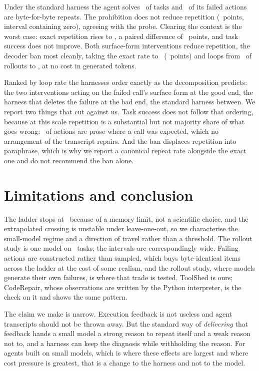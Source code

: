 

Under the standard harness the agent solves \AgentVerbatimSuccess\ of tasks and
\AgentVerbatimRepeat\ of its failed actions are byte-for-byte repeats. The
prohibition does not reduce repetition (\DeltaInstrRepeat\ points, interval
containing zero), agreeing with the probe. Clearing the context is the worst
case: exact repetition rises to \AgentDropRepeat, a paired difference of
\DeltaDropRepeat\ points, and task success does not improve. Both surface-form
interventions reduce repetition, the decoder ban most cleanly, taking the exact
rate to \AgentVerbBanRepeat\ (\DeltaVerbBanRepeat\ points) and loops from
\AgentVerbatimStuck\ of rollouts to \AgentVerbBanStuck, at no cost in generated
tokens.

Ranked by loop rate the harnesses order exactly as the decomposition predicts:
the two interventions acting on the failed call's surface form at the good end,
the harness that deletes the failure at the bad end, the standard harness
between. We report two things that cut against us. Task success does not follow
that ordering, because at this scale repetition is a substantial but not
majority share of what goes wrong: \ProseShare\ of actions are prose where a
call was expected, which no arrangement of the transcript repairs. And the ban
displaces repetition into paraphrase, which is why we report a canonical repeat
rate alongside the exact one and do not recommend the ban alone.

\section{Limitations and conclusion}
\label{sec:ws-limits}

The ladder stops at \LargestModel\ because of a memory limit, not a scientific
choice, and the extrapolated crossing is unstable under leave-one-out, so we
characterise the small-model regime and a direction of travel rather than a
threshold. The rollout study is one model on \AgentNumTasks\ tasks; the
intervals are correspondingly wide. Failing actions are constructed rather than
sampled, which buys byte-identical items across the ladder at the cost of some
realism, and the rollout study, where models generate their own failures, is
where that trade is tested. ToolShed is ours; CodeRepair, whose observations
are written by the Python interpreter, is the check on it and shows the same
pattern.

The claim we make is narrow. Execution feedback is not useless and agent
transcripts should not be thrown away. But the standard way of \emph{delivering}
that feedback hands a small model a strong reason to repeat itself and a weak
reason not to, and a harness can keep the diagnosis while withholding the
reason. For agents built on small models, which is where these effects are
largest and where cost pressure is greatest, that is a change to the harness
and not to the model.
